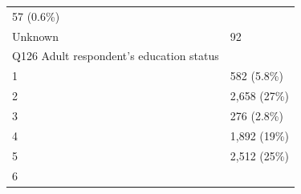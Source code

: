\documentclass[]{article}
\begin{document}
\begin{longtable}[]{@{}ll@{}}
\begin{minipage}[t]{0.23\columnwidth}
57 (0.6\%)\strut
\end{minipage}\tabularnewline
\begin{minipage}[t]{0.71\columnwidth}\raggedright
Unknown\strut
\end{minipage} & \begin{minipage}[t]{0.23\columnwidth}\raggedright
92\strut
\end{minipage}\tabularnewline
\begin{minipage}[t]{0.71\columnwidth}\raggedright
Q126 Adult respondent's education status\strut
\end{minipage} & \begin{minipage}[t]{0.23\columnwidth}\raggedright
\strut
\end{minipage}\tabularnewline
\begin{minipage}[t]{0.71\columnwidth}\raggedright
1\strut
\end{minipage} & \begin{minipage}[t]{0.23\columnwidth}\raggedright
582 (5.8\%)\strut
\end{minipage}\tabularnewline
\begin{minipage}[t]{0.71\columnwidth}\raggedright
2\strut
\end{minipage} & \begin{minipage}[t]{0.23\columnwidth}\raggedright
2,658 (27\%)\strut
\end{minipage}\tabularnewline
\begin{minipage}[t]{0.71\columnwidth}\raggedright
3\strut
\end{minipage} & \begin{minipage}[t]{0.23\columnwidth}\raggedright
276 (2.8\%)\strut
\end{minipage}\tabularnewline
\begin{minipage}[t]{0.71\columnwidth}\raggedright
4\strut
\end{minipage} & \begin{minipage}[t]{0.23\columnwidth}\raggedright
1,892 (19\%)\strut
\end{minipage}\tabularnewline
\begin{minipage}[t]{0.71\columnwidth}\raggedright
5\strut
\end{minipage} & \begin{minipage}[t]{0.23\columnwidth}\raggedright
2,512 (25\%)\strut
\end{minipage}\tabularnewline
\begin{minipage}[t]{0.71\columnwidth}\raggedright
6\strut
\end{minipage} & \begin{minipage}[t]{0.23\columnwidth}\raggedright

\end{minipage}
\end{longtable}
\end{document}
